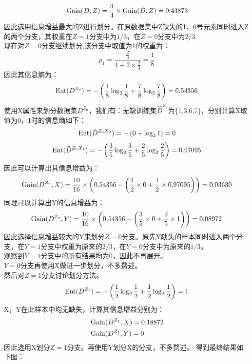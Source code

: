 \documentclass[answers]{exam}  %
\begin{document}
\begin{questions}
\begin{solution}
$$\begin{aligned}
            &\operatornamewithlimits{Gain}(D,Z)=\frac34\times\operatornamewithlimits{Gain}(\hat D,Z)=0.43873\\
        \end{aligned}    $$
        因此选用信息增益最大的Z进行划分。在原数据集中Z缺失的1、6号元素同时进入Z的两个分支，其权重在$Z=1$分支中为$1/3$，在$Z=0$分支中为$2/3$\\
        现在对$Z=0$分支继续划分,该分支中取值为1的权重为：
        $$p_1=\frac{\frac23}{4+2\times\frac23}=\frac18$$
        因此其信息熵为：
        $$\operatornamewithlimits{Ent}(D^{Z_0})=-\left(\frac18\log_2\frac18+\frac78\log_2\frac78 \right)=0.54356$$
        使用X属性来划分数据集$D^{Z_0}$，我们有：无缺训练集$\hat D^{Z_0}$为\{1,3,6,7\}，分别计算X取值为0，1时的信息熵如下：
        $$\begin{aligned}
            &\operatornamewithlimits{Ent}(\hat D^{Z_0X_0})=-\left(0+\log_2 1 \right)=0\\
        \end{aligned} $$
        $$ \operatornamewithlimits{Ent}(\hat D^{Z_0X_1})=-\left(\frac35\log_2\frac35+\frac25\log_2\frac25 \right)= 0.97095$$
        因此可以计算出其信息增益为：
        $$
        \operatornamewithlimits{Gain}(D^{Z_0},X)=\frac{10}{16}\times\left(0.54356-\left(\frac12\times0+\frac12\times0.97095\right) \right)=0.03630
        $$
        同理可以计算出Y的信息增益为：
        $$
        \operatornamewithlimits{Gain}(D^{Z_0},Y)=\frac{10}{16}\times\left(0.54356-\left(\frac35\times0+\frac25\times  1 \right) \right)=0.08972
        $$
        因此选择信息增益较大的Y来划分$Z=0$分支。原先Y缺失的样本同时进入两个分支，在$Y=1$分支中权重为原来的$2/3$，在$Y=0$分支中为原来的$1/3$。\\
        观察到$Y=1$分支中的所有结果均为0，因此不再展开。\\
        $Y=0$分支再使用X做进一步划分，不多赘述。\\
        然后对$Z=1$分支讨论划分方法。
        $$\operatornamewithlimits{Ent}(D^{Z_1})=-\left(\frac12\log_2\frac12+\frac12\log_2\frac12 \right)=1$$
        X，Y在此样本中均无缺失，计算其信息增益分别为：
        $$\begin{aligned}
            &\operatornamewithlimits{Gain}(D^{Z_1},X)=0.18872\\
            &\operatornamewithlimits{Gain}(D^{Z_1},Y)=0\\
        \end{aligned} $$
        因此选用X划分$Z=1$分支。再使用Y划分X的分支，不多赘述。
        得到最终结果如下图：\\

\end{solution}
\end{questions}
\end{document}
